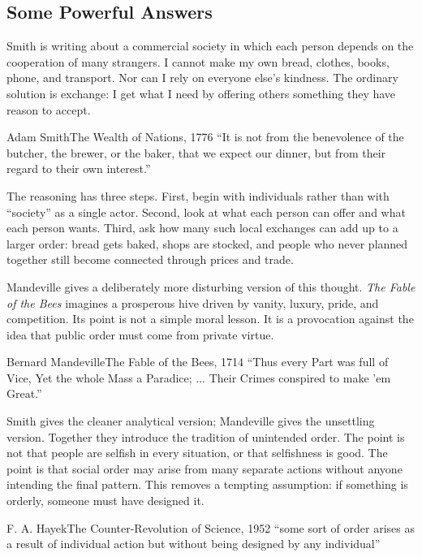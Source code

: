 \documentclass[10pt,a4paper]{article}
\begin{document}
\subsection{Some Powerful Answers}

Smith is writing about a commercial society in which each person depends on the cooperation of many strangers. I cannot make my own bread, clothes, books, phone, and transport. Nor can I rely on everyone else's kindness. The ordinary solution is exchange: I get what I need by offering others something they have reason to accept.

\begin{quotebox}{Adam Smith}{The Wealth of Nations, 1776}
``It is not from the benevolence of the butcher, the brewer, or the baker, that we expect our dinner, but from their regard to their own interest.''
\end{quotebox}

The reasoning has three steps. First, begin with individuals rather than with ``society'' as a single actor. Second, look at what each person can offer and what each person wants. Third, ask how many such local exchanges can add up to a larger order: bread gets baked, shops are stocked, and people who never planned together still become connected through prices and trade.

Mandeville gives a deliberately more disturbing version of this thought. \textit{The Fable of the Bees} imagines a prosperous hive driven by vanity, luxury, pride, and competition. Its point is not a simple moral lesson. It is a provocation against the idea that public order must come from private virtue.

\begin{quotebox}{Bernard Mandeville}{The Fable of the Bees, 1714}
``Thus every Part was full of Vice, Yet the whole Mass a Paradice; ... Their Crimes conspired to make 'em Great.''
\end{quotebox}

Smith gives the cleaner analytical version; Mandeville gives the unsettling version. Together they introduce the tradition of unintended order. The point is not that people are selfish in every situation, or that selfishness is good. The point is that social order may arise from many separate actions without anyone intending the final pattern. This removes a tempting assumption: if something is orderly, someone must have designed it.

\begin{quotebox}{F. A. Hayek}{The Counter-Revolution of Science, 1952}
``some sort of order arises as a result of individual action but without being designed by any individual''
\end{quotebox}
\end{document}
